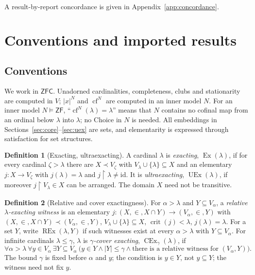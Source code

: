 \documentclass[11pt,letterpaper]{article}
\theoremstyle{definition}
\newtheorem{definition}{Definition}[section]
\numberwithin{equation}{section}
\newcommand{\ZFC}{\mathsf{ZFC}}
\newcommand{\ZF}{\mathsf{ZF}}
\newcommand{\Ex}{\operatorname{Ex}}
\newcommand{\UEx}{\operatorname{UEx}}
\newcommand{\CEx}{\operatorname{CEx}}
\newcommand{\REx}{\operatorname{REx}}
\newcommand{\crit}{\operatorname{crit}}
\newcommand{\cf}{\operatorname{cf}}
\newcommand{\id}{\mathrm{id}}
\newcommand{\restr}{\mathbin{\upharpoonright}}
\begin{document}
A result-by-report concordance is given in Appendix~\ref{app:concordance}.

\section{Conventions and imported results}\label{sec:setup}

\subsection{Conventions}

We work in $\ZFC$. Unadorned cardinalities, completeness, clubs and stationarity are computed in $V$; $|x|^N$ and $\cf^N$ are computed in an inner model $N$. For an inner model $N\models\ZF$, ``$\cf^N(\lambda)=\lambda$'' means that $N$ contains no cofinal map from an ordinal below $\lambda$ into $\lambda$; no Choice in $N$ is needed. All embeddings in Sections~\ref{sec:core}--\ref{sec:uex} are sets, and elementarity is expressed through satisfaction for set structures.

\begin{definition}[Exacting, ultraexacting]\label{def:ex}
A cardinal $\lambda$ is \emph{exacting}, $\Ex(\lambda)$, if for every cardinal $\zeta>\lambda$ there are $X\prec V_\zeta$ with $V_\lambda\cup\{\lambda\}\subseteq X$ and an elementary $j:X\to V_\zeta$ with $j(\lambda)=\lambda$ and $j\restr\lambda\neq\id$. It is \emph{ultraexacting}, $\UEx(\lambda)$, if moreover $j\restr V_\lambda\in X$ can be arranged. The domain $X$ need not be transitive.
\end{definition}

\begin{definition}[Relative and cover exactingness]\label{def:cex}
For $\alpha>\lambda$ and $Y\subseteq V_\alpha$, a \emph{relative $\lambda$-exacting witness} is an elementary $j:(X,\in,X\cap Y)\to(V_\alpha,\in,Y)$ with $(X,\in,X\cap Y)\prec(V_\alpha,\in,Y)$, $V_\lambda\cup\{\lambda\}\subseteq X$, $\crit(j)<\lambda$, $j(\lambda)=\lambda$. For a set $Y$, write $\REx(\lambda,Y)$ if such witnesses exist at every $\alpha>\lambda$ with $Y\subseteq V_\alpha$. For infinite cardinals $\lambda\le\gamma$, $\lambda$ is \emph{$\gamma$-cover exacting}, $\CEx_\gamma(\lambda)$, if
\[
\forall\alpha>\lambda\ \forall y\in V_\alpha\ \exists Y\subseteq V_\alpha\ \bigl(y\in Y\wedge|Y|\le\gamma\wedge\text{there is a relative witness for }(V_\alpha,Y)\bigr).
\]
The bound $\gamma$ is fixed before $\alpha$ and $y$; the condition is $y\in Y$, not $y\subseteq Y$; the witness need not fix $y$.
\end{definition}
\end{document}
